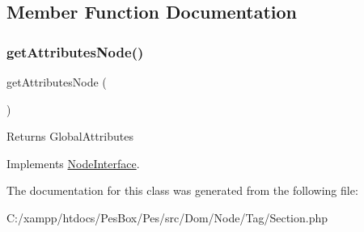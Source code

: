 \subsection{Member Function Documentation}
\mbox{\label{class_pes_1_1_dom_1_1_node_1_1_tag_1_1_section_a4722e7722b245351681b05d35f6694f3}} 
\subsubsection{\texorpdfstring{get\+Attributes\+Node()}{getAttributesNode()}}
{\footnotesize\ttfamily get\+Attributes\+Node (\begin{DoxyParamCaption}{ }\end{DoxyParamCaption})}

\begin{DoxyReturn}{Returns}
Global\+Attributes 
\end{DoxyReturn}


Implements \mbox{\hyperlink{interface_pes_1_1_dom_1_1_node_1_1_node_interface_a4722e7722b245351681b05d35f6694f3}{Node\+Interface}}.



The documentation for this class was generated from the following file\+:\begin{DoxyCompactItemize}
\item 
C\+:/xampp/htdocs/\+Pes\+Box/\+Pes/src/\+Dom/\+Node/\+Tag/Section.\+php\end{DoxyCompactItemize}

